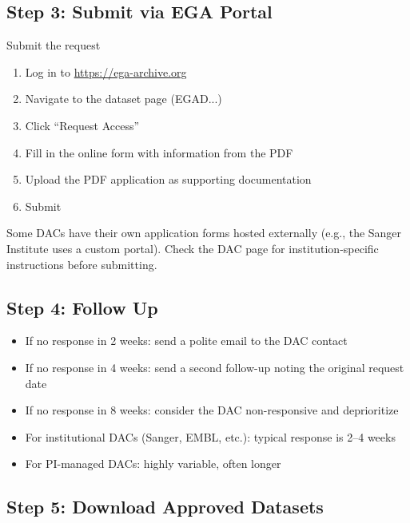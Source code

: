 \documentclass[11pt,letterpaper]{article}
\begin{document}
\subsection{Step 3: Submit via EGA Portal}

\begin{actionbox}{Submit the request}
\begin{enumerate}[nosep]
    \item Log in to \url{https://ega-archive.org}
    \item Navigate to the dataset page (EGAD...)
    \item Click ``Request Access''
    \item Fill in the online form with information from the PDF
    \item Upload the PDF application as supporting documentation
    \item Submit
\end{enumerate}
\end{actionbox}

\begin{notebox}
Some DACs have their own application forms hosted externally (e.g.,
the Sanger Institute uses a custom portal). Check the DAC page for
institution-specific instructions before submitting.
\end{notebox}

\subsection{Step 4: Follow Up}

\begin{itemize}[nosep]
    \item If no response in 2 weeks: send a polite email to the DAC
          contact
    \item If no response in 4 weeks: send a second follow-up noting
          the original request date
    \item If no response in 8 weeks: consider the DAC non-responsive
          and deprioritize
    \item For institutional DACs (Sanger, EMBL, etc.): typical response
          is 2--4 weeks
    \item For PI-managed DACs: highly variable, often longer
\end{itemize}

\subsection{Step 5: Download Approved Datasets}
\end{document}
